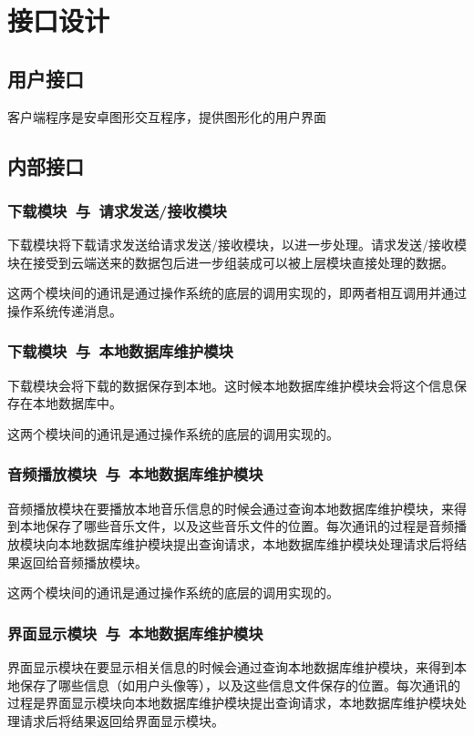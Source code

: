 \chapter{接口设计}
\section{用户接口}
客户端程序是安卓图形交互程序，提供图形化的用户界面

\section{内部接口}
\subsection{下载模块\ 与\ 请求发送/接收模块}
下载模块将下载请求发送给请求发送/接收模块，以进一步处理。请求发送/接收模块在接受到云端送来的数据包后进一步组装成可以被上层模块直接处理的数据。

这两个模块间的通讯是通过操作系统的底层的调用实现的，即两者相互调用并通过操作系统传递消息。

\subsection{下载模块\ 与\ 本地数据库维护模块}
下载模块会将下载的数据保存到本地。这时候本地数据库维护模块会将这个信息保存在本地数据库中。

这两个模块间的通讯是通过操作系统的底层的调用实现的。

\subsection{音频播放模块\ 与\ 本地数据库维护模块}
音频播放模块在要播放本地音乐信息的时候会通过查询本地数据库维护模块，来得到本地保存了哪些音乐文件，以及这些音乐文件的位置。每次通讯的过程是音频播放模块向本地数据库维护模块提出查询请求，本地数据库维护模块处理请求后将结果返回给音频播放模块。

这两个模块间的通讯是通过操作系统的底层的调用实现的。

\subsection{界面显示模块\ 与\ 本地数据库维护模块}
界面显示模块在要显示相关信息的时候会通过查询本地数据库维护模块，来得到本地保存了哪些信息（如用户头像等），以及这些信息文件保存的位置。每次通讯的过程是界面显示模块向本地数据库维护模块提出查询请求，本地数据库维护模块处理请求后将结果返回给界面显示模块。

